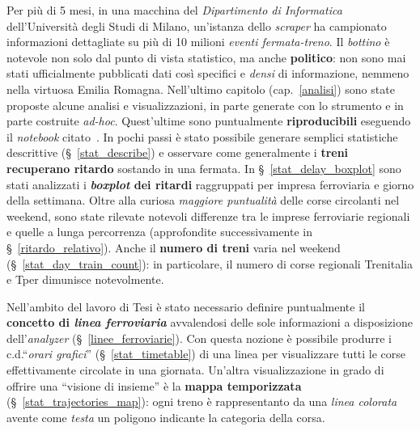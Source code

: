 \documentclass[12pt,a4paper,italian]{report}
\begin{document}
Per più di 5 mesi, in una macchina del \textit{Dipartimento di
    Informatica} dell'Università degli Studi di Milano, un'istanza
dello \textit{scraper} ha campionato informazioni dettagliate su più
di 10 milioni \textit{eventi fermata-treno}.  Il \textit{bottino} è
notevole non solo dal punto di vista statistico, ma anche
\textbf{politico}: non sono mai stati ufficialmente pubblicati dati
così specifici e \textit{densi} di informazione, nemmeno nella
virtuosa Emilia Romagna.  Nell'ultimo capitolo (cap.\@~\ref{analisi})
sono state proposte alcune analisi e visualizzazioni, in parte
generate con lo strumento e in parte costruite \textit{ad-hoc}.
Quest'ultime sono puntualmente \textbf{riproducibili} eseguendo il
\textit{notebook} citato~\cite{StatJup}.  In pochi passi è stato
possibile generare semplici statistiche descrittive
(\S~\ref{stat_describe}) e osservare come generalmente i \textbf{treni
    recuperano ritardo} sostando in una fermata.  In
\S~\ref{stat_delay_boxplot} sono stati analizzati i
\textbf{\textit{boxplot} dei ritardi} raggruppati per impresa
ferroviaria e giorno della settimana.  Oltre alla curiosa
\textit{maggiore puntualità} delle corse circolanti nel weekend, sono
state rilevate notevoli differenze tra le imprese ferroviarie
regionali e quelle a lunga percorrenza (approfondite successivamente
in \S~\ref{ritardo_relativo}).  Anche il \textbf{numero di treni}
varia nel weekend (\S~\ref{stat_day_train_count}): in particolare, il
numero di corse regionali Trenitalia e Tper dimunisce notevolmente.

Nell'ambito del lavoro di Tesi è stato necessario definire
puntualmente il \textbf{concetto di \textit{linea ferroviaria}}
avvalendosi delle sole informazioni a disposizione
dell'\textit{analyzer} (\S~\ref{linee_ferroviarie}).  Con questa
nozione è possibile produrre i c.d.\@ ``\textit{orari grafici}''
(\S~\ref{stat_timetable}) di una linea per visualizzare tutti le corse
effettivamente circolate in una giornata.  Un'altra visualizzazione in
grado di offrire una ``visione di insieme'' è la \textbf{mappa
    temporizzata} (\S~\ref{stat_trajectories_map}): ogni treno è
rappresentanto da una \textit{linea colorata} avente come
\textit{testa} un poligono indicante la categoria della corsa.
\end{document}
